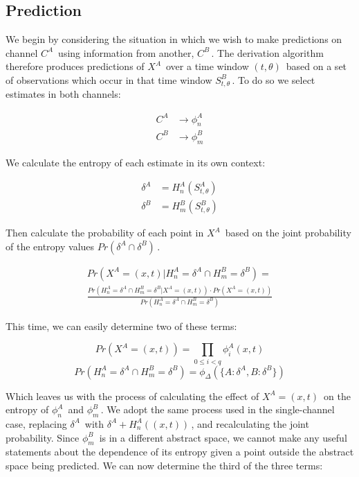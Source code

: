 \documentclass[10pt]{article}
\begin{document}
\subsection{Prediction}
We begin by considering the situation in which we wish to make predictions on channel \(C^A \,\!\) using information from another, \(C^B \,\!\).  The derivation algorithm therefore produces predictions of \(X^A \,\!\) over a time window \((t,\theta) \,\!\) based on a set of observations which occur in that time window \(S_{t,\theta}^B \,\!\).  To do so we select estimates in both channels:

\begin{align*}
C^A &\rightarrow \phi_n^A \\
C^B &\rightarrow \phi_m^B
\end{align*}

We calculate the entropy of each estimate in its own context:

\begin{align*}
\delta^A &= H_n^A( S_{t,\theta}^A ) \\
\delta^B &= H_m^B( S_{t,\theta}^B )
\end{align*}

Then calculate the probability of each point in \(X^A \,\!\) based on the joint probability of the entropy values \(Pr(\delta^A \cap \delta^B) \,\!\).

\begin{multline}
Pr \left( X^A = (x,t) | H_n^A = \delta^A \cap H_m^B = \delta^B \right) = \\
\frac 
{ Pr \left( H_n^A = \delta^A \cap H_m^B = \delta^B | X^A = (x,t) \right) \cdot Pr \left( X^A = (x,t) \right) }
{ Pr \left( H_n^A = \delta^A \cap H_m^B = \delta^B \right) }
\end{multline}

This time, we can easily determine two of these terms:

\begin{equation} Pr \left( X^A = (x,t) \right) = \prod_{0 \le i < q} \phi_i^A(x,t) \end{equation}
\begin{equation} Pr \left( H_n^A = \delta^A \cap H_m^B = \delta^B \right) = \phi_\Delta \left( \{ A: \delta^A, B: \delta^B \} \right) \end{equation}

Which leaves us with the process of calculating the effect of \(X^A = (x,t) \,\!\) on the entropy of \(\phi_n^A \,\!\) and \(\phi_m^B \,\!\).  We adopt the same process used in the single-channel case, replacing \(\delta^A \,\!\) with \(\delta^A + H_n^A((x,t)) \,\!\), and recalculating the joint probability. Since \(\phi_m^B \,\!\) is in a different abstract space, we cannot make any useful statements about the dependence of its entropy given a point outside the abstract space being predicted.  We can now determine the third of the three terms:
\end{document}
